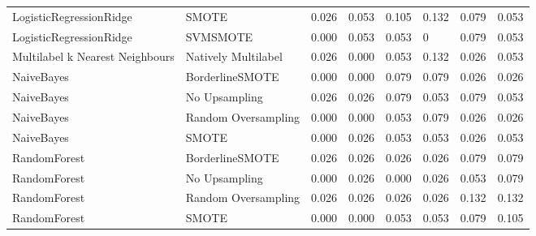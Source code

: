 \begin{tabular}{llllllll}
        LogisticRegressionRidge &                         SMOTE & 0.026 &                     0.053 &                 0.105 &                  0.132 &                                   0.079 &    0.053 \\
        LogisticRegressionRidge &                      SVMSMOTE & 0.000 &                     0.053 &                 0.053 &                      0 &                                   0.079 &    0.053 \\
Multilabel k Nearest Neighbours &           Natively Multilabel & 0.026 &                     0.000 &                 0.053 &                  0.132 &                                   0.026 &    0.053 \\
                     NaiveBayes &               BorderlineSMOTE & 0.000 &                     0.000 &                 0.079 &                  0.079 &                                   0.026 &    0.026 \\
                     NaiveBayes &                 No Upsampling & 0.026 &                     0.026 &                 0.079 &                  0.053 &                                   0.079 &    0.053 \\
                     NaiveBayes &           Random Oversampling & 0.000 &                     0.000 &                 0.053 &                  0.079 &                                   0.026 &    0.026 \\
                     NaiveBayes &                         SMOTE & 0.000 &                     0.026 &                 0.053 &                  0.053 &                                   0.026 &    0.053 \\
                   RandomForest &               BorderlineSMOTE & 0.026 &                     0.026 &                 0.026 &                  0.026 &                                   0.079 &    0.079 \\
                   RandomForest &                 No Upsampling & 0.000 &                     0.026 &                 0.000 &                  0.026 &                                   0.053 &    0.079 \\
                   RandomForest &           Random Oversampling & 0.026 &                     0.026 &                 0.026 &                  0.026 &                                   0.132 &    0.132 \\
                   RandomForest &                         SMOTE & 0.000 &                     0.000 &                 0.053 &                  0.053 &                                   0.079 &    0.105 \\

\end{tabular}
